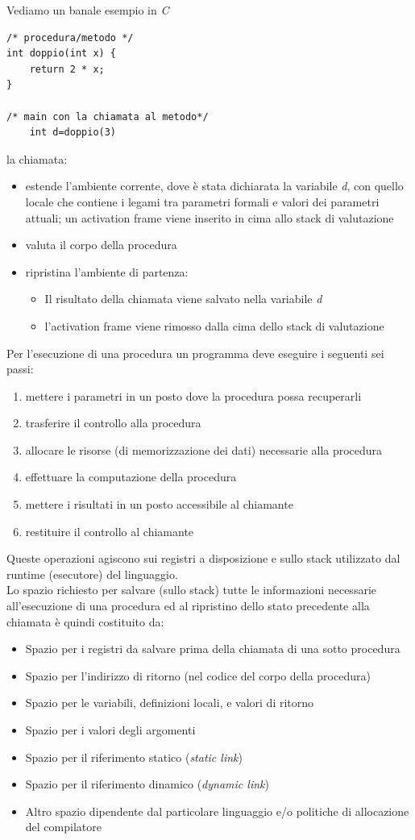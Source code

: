 \documentclass[a4paper,12pt, oneside]{book}
\begin{document}
\begin{esempio}
Vediamo un banale esempio in \textit{C}
\begin{verbatim}
/* procedura/metodo */
int doppio(int x) { 
	return 2 * x; 
}

/* main con la chiamata al metodo*/
	int d=doppio(3)
\end{verbatim}
la chiamata:
\begin{itemize}
\item estende l'ambiente corrente, dove è stata dichiarata la variabile \textit{d}, con quello locale che contiene i legami tra parametri formali e valori dei parametri attuali; un activation frame viene inserito in cima allo stack di valutazione
\item valuta il corpo della procedura
\item ripristina l'ambiente di partenza:
\begin{itemize}
\item Il risultato della chiamata viene salvato nella variabile \textit{d}
\item l'activation frame viene rimosso dalla cima dello stack di valutazione
\end{itemize}
\end{itemize}
\end{esempio}
Per l'esecuzione di una procedura un programma deve eseguire i seguenti sei passi:
\begin{enumerate}
\item mettere i parametri in un posto dove la procedura possa recuperarli
\item trasferire il controllo alla procedura
\item allocare le risorse (di memorizzazione dei dati) necessarie alla procedura
\item effettuare la computazione della procedura
\item mettere i risultati in un posto accessibile al chiamante
\item restituire il controllo al chiamante
\end{enumerate}
Queste operazioni agiscono sui registri a disposizione e sullo stack utilizzato dal runtime (esecutore) del linguaggio.\\
Lo spazio richiesto per salvare (sullo stack) tutte le informazioni necessarie all'esecuzione di una procedura ed al ripristino dello stato precedente alla chiamata è quindi costituito da:
\begin{itemize}
\item Spazio per i registri da salvare prima della chiamata di una sotto procedura
\item Spazio per l'indirizzo di ritorno (nel codice del corpo della procedura)
\item Spazio per le variabili, definizioni locali, e valori di ritorno
\item Spazio per i valori degli argomenti
\item Spazio per il riferimento statico (\textit{static link})
\item Spazio per il riferimento dinamico (\textit{dynamic link})
\item Altro spazio dipendente dal particolare linguaggio e/o politiche di allocazione del compilatore
\end{itemize}
\end{document}

